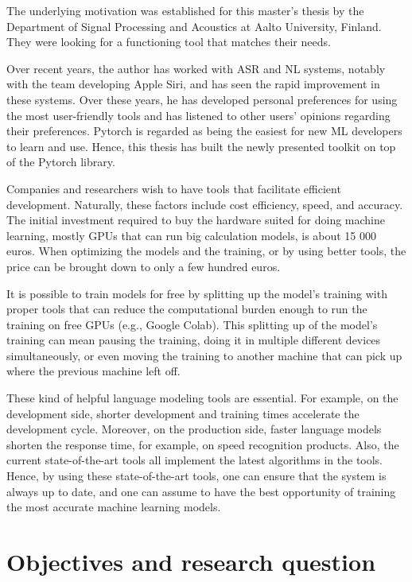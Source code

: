 The underlying motivation was established for this master's thesis by the Department of Signal Processing and Acoustics at Aalto University, Finland. They were looking for a functioning tool that matches their needs.

Over recent years, the author has worked with ASR and NL systems, notably with the team developing Apple Siri, and has seen the rapid improvement in these systems. Over these years, he has developed personal preferences for using the most user-friendly tools and has listened to other users' opinions regarding their preferences. Pytorch is regarded as being the easiest for new ML developers to learn and use. Hence, this thesis has built the newly presented toolkit on top of the Pytorch library.

Companies and researchers wish to have tools that facilitate efficient development. Naturally, these factors include cost efficiency, speed, and accuracy. The initial investment required to buy the hardware suited for doing machine learning, mostly GPUs that can run big calculation models, is about 15 000 euros. When optimizing the models and the training, or by using better tools, the price can be brought down to only a few hundred euros. 

It is possible to train models for free by splitting up the model's training with proper tools that can reduce the computational burden enough to run the training on free GPUs (e.g., Google Colab). This splitting up of the model's training can mean pausing the training, doing it in multiple different devices simultaneously, or even moving the training to another machine that can pick up where the previous machine left off. 

These kind of helpful language modeling tools are essential. For example, on the development side, shorter development and training times accelerate the development cycle. Moreover, on the production side, faster language models shorten the response time, for example, on speed recognition products. Also, the current state-of-the-art tools all implement the latest algorithms in the tools. Hence, by using these state-of-the-art tools, one can ensure that the system is always up to date, and one can assume to have the best opportunity of training the most accurate machine learning models.

\section{Objectives and research question}

